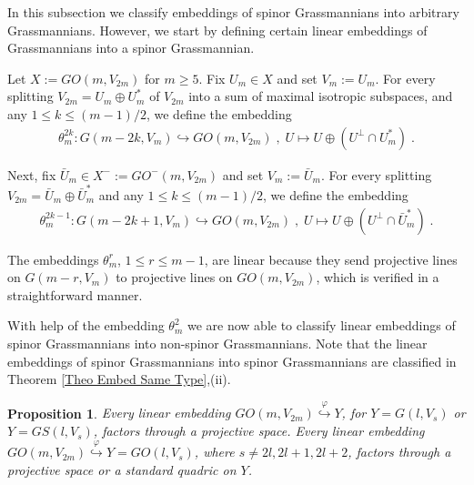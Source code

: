 \documentclass[12pt]{amsart}
\newtheorem{prop}[theorem]{Proposition}
\begin{document}
In this subsection we classify embeddings of spinor Grassmannians into arbitrary Grassmannians. However, we start by defining certain linear embeddings of Grassmannians into a spinor Grassmannian.

Let $X:=GO(m,V_{2m})$ for $m\geq 5$. Fix $U_m\in X$ and set $V_m:= U_m$. For every splitting $V_{2m}=U_m\oplus U_m^*$ of $V_{2m}$ into a sum of maximal isotropic subspaces, and any $1\leq k\leq (m-1)/2$, we define the embedding
\begin{gather}\label{For Special Embed theta mr even}
\theta^{2k}_m: G(m-2k,V_m) \hookrightarrow GO(m,V_{2m}) \;,\; U\mapsto U\oplus (U^\perp\cap U_m^*)\;.
\end{gather}

Next, fix $\bar U_m\in X^{-}:=GO^-(m,V_{2m})$ and set $V_m:= \bar U_m$. For every splitting $V_{2m}=\bar U_m\oplus \bar U_m^*$ and any $1\leq k\leq (m-1)/2$, we define the embedding
\begin{gather}\label{For Special Embed theta mr odd}
\theta^{2k-1}_m: G(m-2k+1, V_m) \hookrightarrow GO(m,V_{2m}) \;,\; U\mapsto U\oplus (U^\perp\cap \bar U_m^*)\;.
\end{gather}

The embeddings $\theta_m^{r}$, $1\leq r\leq m-1$, are linear because they send projective lines on $G(m-r,V_m)$ to projective lines on $GO(m,V_{2m})$, which is verified in a straightforward manner.

With help of the embedding $\theta_m^2$ we are now able to classify linear embeddings of spinor Grassmannians into non-spinor Grassmannians. Note that the linear embeddings of spinor Grassmannians into spinor Grassmannians are classified in Theorem \ref{Theo Embed Same Type},(ii).

\begin{prop}\label{Prop embed spinor through proj}
Every linear embedding $GO(m,V_{2m}) \stackrel{\varphi}{\hookrightarrow} Y$, for $Y=G(l,V_s)$ or $Y=GS(l,V_s)$, factors through a projective space. Every linear embedding $GO(m,V_{2m}) \stackrel{\varphi}{\hookrightarrow} Y= GO(l,V_s)$, where $s\ne 2l,2l+1,2l+2$, factors through a projective space or a standard quadric on $Y$.
\end{prop}
\end{document}
